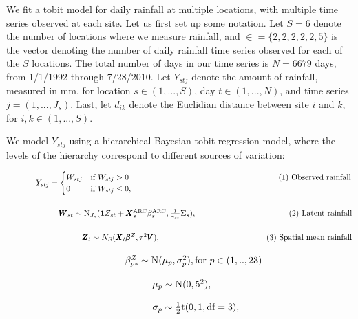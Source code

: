 \documentclass[12pt]{article}
\def\bbeta{\pmb{\beta}}
\def\bX{\pmb{X}}
\def\bZ{\pmb{Z}}
\def\bV{\pmb{V}}
\def\bW{\pmb{W}}
\begin{document}
We fit a tobit model for daily rainfall at multiple locations, with multiple time series observed at each site. Let us first set up some notation. Let $S=6$ denote the number of locations where we measure rainfall, and $\in = \{2,2,2,2,2,5\}$ is the vector denoting the number of daily rainfall time series observed for each of the $S$ locations. The total number of days in our time series is $N=6679$ days, from 1/1/1992 through 7/28/2010. Let $Y_{stj}$ denote the amount of rainfall, measured in mm, for location $s \in (1,...,S)$, day $t \in (1,...,N)$, and time series $j = (1,...,J_s)$. Last, let $d_{ik}$ denote the Euclidian distance between site $i$ and $k$, for $i,k \in (1,...,S)$.

We model $Y_{stj}$ using a hierarchical Bayesian tobit regression model, where the levels of the hierarchy correspond to different sources of variation:

$\hspace{0.5in}
Y_{stj} = \begin{cases} W_{stj} &\mbox{if } W_{stj} > 0 \hspace{2.6in} \text{(1) Observed rainfall}\\
0  &\mbox{if } W_{stj} \leq 0, \end{cases}
$

$\hspace{0.9in}
\bW_{st} \sim \text{N}_{J_s}(\mathbf{1}Z_{st} + \bX^\text{ARC}_s \beta^\text{ARC}_s, \frac{1}{\gamma_{st}}\Sigma_s), \hspace{1.6in} \text{(2) Latent rainfall}
$

$\hspace{1.3in}
\bZ_t \sim N_S(\bX_t \bbeta^Z, \tau^2\bV), \hspace{1.85in} \text{(3) Spatial mean rainfall}
$

$\hspace{1.7in}
\beta_{ps}^Z \sim \text{N}(\mu_p, \sigma^2_p),  \text{for $p \in (1,..,23)$}
$

$\hspace{2.1in}
\mu_{p} \sim \text{N}(0, 5^2),
$

$\hspace{2.1in}
\sigma_{p} \sim \frac{1}{2}\text{t}(0, 1, \text{df} = 3),
$
\end{document}
